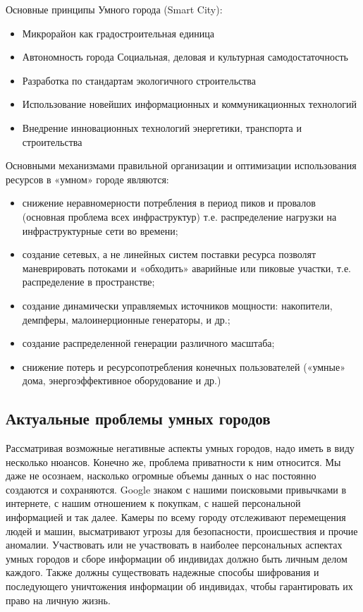   Основные принципы Умного города (Smart City): 
  \begin{itemize}
  \item Микрорайон как градостроительная единица 
  \item Автономность города Социальная, деловая и  культурная самодостаточность 
  \item Разработка по стандартам экологичного строительства 
  \item Использование новейших информационных и коммуникационных технологий 
  \item Внедрение инновационных технологий энергетики, транспорта и строительства 
\end{itemize}

  Основными механизмами правильной организации и  оптимизации использования ресурсов в «умном» городе являются: 
  \begin{itemize}
  \item снижение неравномерности потребления в период пиков и провалов (основная проблема всех инфраструктур) т.е. распределение нагрузки на инфраструктурные сети во времени; 
  \item создание сетевых, а не линейных систем поставки ресурса позволят маневрировать потоками и «обходить» аварийные или пиковые участки, т.е. распределение в пространстве; 
  \item создание динамически управляемых источников мощности: накопители, демпферы, малоинерционные генераторы, и др.; 
  \item создание распределенной генерации различного масштаба;
  \item снижение потерь и ресурсопотребления конечных пользователей («умные» дома, энергоэффективное оборудование и др.)
\end{itemize}

\subsection{Актуальные проблемы умных городов}
Рассматривая возможные негативные аспекты умных городов, надо иметь в виду несколько нюансов.\cite{Almanah} Конечно же, проблема приватности к ним относится. Мы даже не осознаем, насколько огромные объемы данных о нас постоянно создаются и сохраняются. Google знаком с нашими поисковыми привычками в интернете, с нашим отношением к покупкам, с нашей персональной информацией и так далее. Камеры по всему городу отслеживают перемещения людей и машин, высматривают угрозы для безопасности, происшествия и прочие аномалии. Участвовать или не участвовать в наиболее персональных аспектах умных городов и сборе информации об индивидах должно быть личным делом каждого. Также должны существовать надежные способы шифрования и последующего уничтожения информации об индивидах, чтобы гарантировать их право на личную жизнь.

